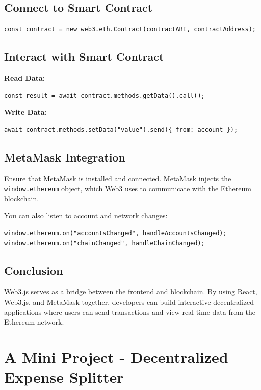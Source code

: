 \documentclass[12pt, a4paper]{article}
\begin{document}
\subsection{Connect to Smart Contract}
\begin{verbatim}
const contract = new web3.eth.Contract(contractABI, contractAddress);
\end{verbatim}

\subsection{Interact with Smart Contract}
\textbf{Read Data:}
\begin{verbatim}
const result = await contract.methods.getData().call();
\end{verbatim}

\textbf{Write Data:}
\begin{verbatim}
await contract.methods.setData("value").send({ from: account });
\end{verbatim}

\subsection{MetaMask Integration}
Ensure that MetaMask is installed and connected. MetaMask injects the \texttt{window.ethereum} object, which Web3 uses to communicate with the Ethereum blockchain.

You can also listen to account and network changes:
\begin{verbatim}
window.ethereum.on("accountsChanged", handleAccountsChanged);
window.ethereum.on("chainChanged", handleChainChanged);
\end{verbatim}

\subsection{Conclusion}
Web3.js serves as a bridge between the frontend and blockchain. By using React, Web3.js, and MetaMask together, developers can build interactive decentralized applications where users can send transactions and view real-time data from the Ethereum network.
\section{A Mini Project - Decentralized Expense Splitter}
\end{document}
